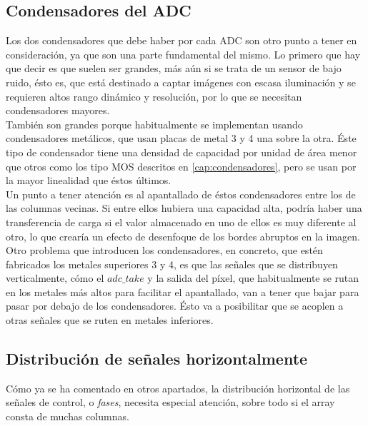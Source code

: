 \subsection{Condensadores del ADC}

Los dos condensadores que debe haber por cada ADC son otro punto a tener en
consideración, ya que son una parte fundamental del mismo. Lo primero que
hay que decir es que suelen ser grandes, más aún si se trata de un sensor de
bajo ruido, ésto es, que está destinado a captar imágenes con escasa iluminación
y se requieren altos rango dinámico y resolución, por lo que se necesitan condensadores
mayores.\\

También son grandes porque habitualmente se implementan usando condensadores
metálicos, que usan placas de metal 3 y 4 una sobre la otra. Éste tipo de condensador
tiene una densidad de capacidad por unidad de área menor que otros como los tipo
MOS descritos en \ref{cap:condensadores}, pero se usan por la mayor linealidad que
éstos últimos.\\

Un punto a tener atención es al apantallado de éstos condensadores entre los de
las columnas vecinas. Si entre ellos hubiera una capacidad alta, podría haber
una transferencia de carga si el valor almacenado en uno de ellos es muy diferente
al otro, lo que crearía un efecto de desenfoque de los bordes abruptos en la imagen.\\

Otro problema que introducen los condensadores, en concreto, que estén fabricados
los metales superiores 3 y 4, es que las señales que se distribuyen verticalmente,
cómo el $adc\_take$ y la salida del píxel, que habitualmente se rutan en los metales
más altos para facilitar el apantallado, van a tener que bajar para pasar por debajo
de los condensadores. Ésto va a posibilitar que se acoplen a otras señales que se ruten
en metales inferiores.\\

\subsection{Distribución de señales horizontalmente}

Cómo ya se ha comentado en otros apartados, la distribución horizontal de las
señales de control, o \textit{fases}, necesita especial atención, sobre todo
si el array consta de muchas columnas.\\

